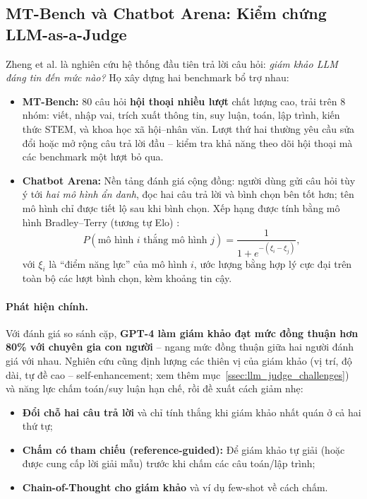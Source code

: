 \subsection{MT-Bench và Chatbot Arena: Kiểm chứng LLM-as-a-Judge \newtag}
\label{ssec:mtbench_arena}
Zheng et al. \cite{zheng2023judging} là nghiên cứu hệ thống đầu tiên trả lời câu hỏi: \emph{giám khảo LLM đáng tin đến mức nào?} Họ xây dựng hai benchmark bổ trợ nhau:
\begin{itemize}
	\item \textbf{MT-Bench:} 80 câu hỏi \textbf{hội thoại nhiều lượt} chất lượng cao, trải trên 8 nhóm: viết, nhập vai, trích xuất thông tin, suy luận, toán, lập trình, kiến thức STEM, và khoa học xã hội--nhân văn. Lượt thứ hai thường yêu cầu sửa đổi hoặc mở rộng câu trả lời đầu -- kiểm tra khả năng theo dõi hội thoại mà các benchmark một lượt bỏ qua.
	\item \textbf{Chatbot Arena:} Nền tảng đánh giá cộng đồng: người dùng gửi câu hỏi tùy ý tới \emph{hai mô hình ẩn danh}, đọc hai câu trả lời và bình chọn bên tốt hơn; tên mô hình chỉ được tiết lộ sau khi bình chọn. Xếp hạng được tính bằng mô hình Bradley--Terry (tương tự Elo) \cite{chiang2024arena}:
	\[
	P(\text{mô hình } i \text{ thắng mô hình } j) = \frac{1}{1 + e^{-(\xi_i - \xi_j)}},
	\]
	với $\xi_i$ là “điểm năng lực” của mô hình $i$, ước lượng bằng hợp lý cực đại trên toàn bộ các lượt bình chọn, kèm khoảng tin cậy.
\end{itemize}

\paragraph{Phát hiện chính.} Với đánh giá so sánh cặp, \textbf{GPT-4 làm giám khảo đạt mức đồng thuận hơn 80\% với chuyên gia con người} -- ngang mức đồng thuận giữa hai người đánh giá với nhau. Nghiên cứu cũng định lượng các thiên vị của giám khảo (vị trí, độ dài, tự đề cao -- self-enhancement; xem thêm mục~\ref{ssec:llm_judge_challenges}) và năng lực chấm toán/suy luận hạn chế, rồi đề xuất cách giảm nhẹ:
\begin{itemize}
	\item \textbf{Đổi chỗ hai câu trả lời} và chỉ tính thắng khi giám khảo nhất quán ở cả hai thứ tự;
	\item \textbf{Chấm có tham chiếu (reference-guided):} Để giám khảo tự giải (hoặc được cung cấp lời giải mẫu) trước khi chấm các câu toán/lập trình;
	\item \textbf{Chain-of-Thought cho giám khảo} và ví dụ few-shot về cách chấm.
\end{itemize}

